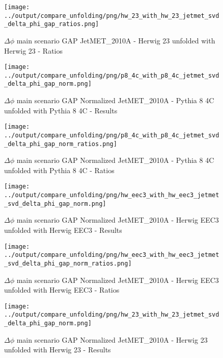 \documentclass[11pt]{book}
\begin{document}
\begin{figure}[ht]
\centering
\texttt{[image: ../output/compare\_unfolding/png/hw\_23\_with\_hw\_23\_jetmet\_svd\_delta\_phi\_gap\_ratios.png]}
\caption{$\Delta\phi$ main scenario GAP JetMET\_2010A - Herwig 23 unfolded with Herwig 23 - Ratios}
\label{hw_23_hw_23_jetmet_svd_delta_phi_gap_b}
\end{figure}


\begin{figure}[ht]
\centering
\texttt{[image: ../output/compare\_unfolding/png/p8\_4c\_with\_p8\_4c\_jetmet\_svd\_delta\_phi\_gap\_norm.png]}
\caption{$\Delta\phi$ main scenario GAP Normalized JetMET\_2010A - Pythia 8 4C unfolded with Pythia 8 4C - Results}
\label{p8_p8_jetmet_svd_delta_phi_gap_norm_a}
\end{figure}

\begin{figure}[ht]
\centering
\texttt{[image: ../output/compare\_unfolding/png/p8\_4c\_with\_p8\_4c\_jetmet\_svd\_delta\_phi\_gap\_norm\_ratios.png]}
\caption{$\Delta\phi$ main scenario GAP Normalized JetMET\_2010A - Pythia 8 4C unfolded with Pythia 8 4C - Ratios}
\label{p8_p8_jetmet_svd_delta_phi_gap_norm_b}
\end{figure}

\begin{figure}[ht]
\centering
\texttt{[image: ../output/compare\_unfolding/png/hw\_eec3\_with\_hw\_eec3\_jetmet\_svd\_delta\_phi\_gap\_norm.png]}
\caption{$\Delta\phi$ main scenario GAP Normalized JetMET\_2010A - Herwig EEC3 unfolded with Herwig EEC3 - Results}
\label{hw_eec3_hw_eec3_jetmet_svd_delta_phi_gap_norm_a}
\end{figure}

\begin{figure}[ht]
\centering
\texttt{[image: ../output/compare\_unfolding/png/hw\_eec3\_with\_hw\_eec3\_jetmet\_svd\_delta\_phi\_gap\_norm\_ratios.png]}
\caption{$\Delta\phi$ main scenario GAP Normalized JetMET\_2010A - Herwig EEC3 unfolded with Herwig EEC3 - Ratios}
\label{hw_eec3_hw_eec3_jetmet_svd_delta_phi_gap_norm_b}
\end{figure}

\begin{figure}[ht]
\centering
\texttt{[image: ../output/compare\_unfolding/png/hw\_23\_with\_hw\_23\_jetmet\_svd\_delta\_phi\_gap\_norm.png]}
\caption{$\Delta\phi$ main scenario GAP Normalized JetMET\_2010A - Herwig 23 unfolded with Herwig 23 - Results}
\label{hw_23_hw_23_jetmet_svd_delta_phi_gap_norm_a}
\end{figure}
\end{document}
